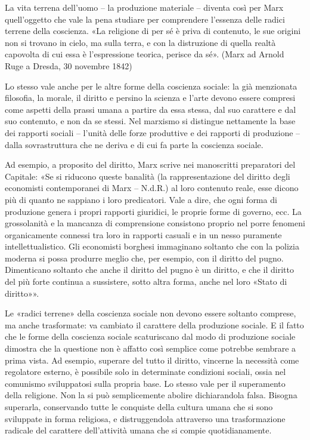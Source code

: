 \documentclass[../main]{subfiles}
\begin{document}
La vita terrena dell'uomo – la produzione materiale – diventa così per Marx quell'oggetto che vale la pena studiare per comprendere l'essenza delle radici terrene della coscienza. «La religione di per sé è priva di contenuto, le sue origini non si trovano in cielo, ma sulla terra, e con la distruzione di quella realtà capovolta di cui essa è l'espressione teorica, perisce da sé». (Marx ad Arnold Ruge a Dresda, 30 novembre 1842)

Lo stesso vale anche per le altre forme della coscienza sociale: la già menzionata filosofia, la morale, il diritto e persino la scienza e l'arte devono essere compresi come aspetti della prassi umana a partire da essa stessa, dal suo carattere e dal suo contenuto, e non da se stessi. Nel marxismo si distingue nettamente la base dei rapporti sociali – l'unità delle forze produttive e dei rapporti di produzione – dalla sovrastruttura che ne deriva e di cui fa parte la coscienza sociale.

Ad esempio, a proposito del diritto, Marx scrive nei manoscritti preparatori del Capitale: «Se si riducono queste banalità (la rappresentazione del diritto degli economisti contemporanei di Marx – N.d.R.) al loro contenuto reale, esse dicono più di quanto ne sappiano i loro predicatori. Vale a dire, che ogni forma di produzione genera i propri rapporti giuridici, le proprie forme di governo, ecc. La grossolanità e la mancanza di comprensione consistono proprio nel porre fenomeni organicamente connessi tra loro in rapporti casuali e in un nesso puramente intellettualistico. Gli economisti borghesi immaginano soltanto che con la polizia moderna si possa produrre meglio che, per esempio, con il diritto del pugno. Dimenticano soltanto che anche il diritto del pugno è un diritto, e che il diritto del più forte continua a sussistere, sotto altra forma, anche nel loro «Stato di diritto»».

Le «radici terrene» della coscienza sociale non devono essere soltanto comprese, ma anche trasformate: va cambiato il carattere della produzione sociale. E il fatto che le forme della coscienza sociale scaturiscano dal modo di produzione sociale dimostra che la questione non è affatto così semplice come potrebbe sembrare a prima vista. Ad esempio, superare del tutto il diritto, vincerne la necessità come regolatore esterno, è possibile solo in determinate condizioni sociali, ossia nel comunismo sviluppatosi sulla propria base. Lo stesso vale per il superamento della religione. Non la si può semplicemente abolire dichiarandola falsa. Bisogna superarla, conservando tutte le conquiste della cultura umana che si sono sviluppate in forma religiosa, e distruggendola attraverso una trasformazione radicale del carattere dell'attività umana che si compie quotidianamente.
\end{document}

